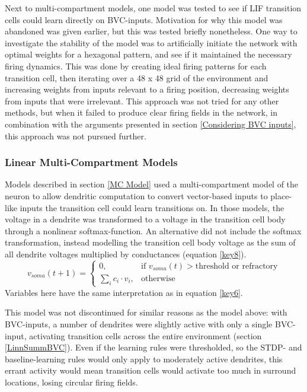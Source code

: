 \documentclass{article}
\begin{document}
    Next to multi-compartment models, one model was tested to see if LIF transition cells could learn directly on BVC-inputs. Motivation for why this model was abandoned was given earlier, but this was tested briefly nonetheless. One way to investigate the stability of the model was to artificially initiate the network with optimal weights for a hexagonal pattern, and see if it maintained the necessary firing dynamics. This was done by creating ideal firing patterns for each transition cell, then iterating over a 48 x 48 grid of the environment and increasing weights from inputs relevant to a firing position, decreasing weights from inputs that were irrelevant. This approach was not tried for any other methods, but when it failed to produce clear firing fields in the network, in combination with the arguments presented in section \ref{Considering BVC inputs}, this approach was not pursued further.

    \subsubsection{Linear Multi-Compartment Models} \label{Lin MCModel}

    Models described in section \ref{MC Model} used a multi-compartment model of the neuron to allow dendritic computation to convert vector-based inputs to place-like inputs the transition cell could learn transitions on. In those models, the voltage in a dendrite was transformed to a voltage in the transition cell body through a nonlinear softmax-function. An alternative did not include the softmax transformation, instead modelling the transition cell body voltage as the sum of all dendrite voltages multiplied by conductances (equation \ref{key8}). \begin{equation}\label{key8} v_{soma}(t + 1) = \begin{cases} 0, & \text{if } v_{soma}(t) > \text{threshold or refractory}\\
        \sum_{i}^{} c_i \cdot v_i, & \text{otherwise} \end{cases}\end{equation} 
    Variables here have the same interpretation as in equation \ref{key6}.

    This model was not discontinued for similar reasons as the model above: with BVC-inputs, a number of dendrites were slightly active with only a single BVC-input, activating transition cells across the entire environment (section \ref{LinnSummBVC}). Even if the learning rules were thresholded, so the STDP- and baseline-learning rules would only apply to moderately active dendrites, this errant activity would mean transition cells would activate too much in surround locations, losing circular firing fields.
\end{document}
